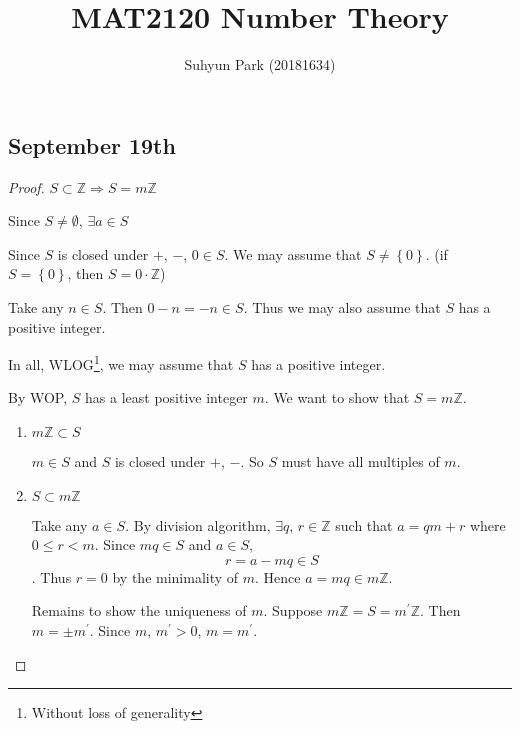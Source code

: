 
\usepackage{pgfplots}
\pgfplotsset{compat=newest}



\title{MAT2120 Number Theory}
\author{Suhyun Park (20181634)}

\subsection{September 19th}

\begin{proof}
    $S \subset \mathbb{Z} \Rightarrow S = m\mathbb{Z}$

    Since $S \neq \emptyset$, $\exists a \in S$

    Since $S$ is closed under $+$, $-$, $0 \in S$. We may assume that
    $S \neq \left\{0\right\}$. (if $S = \left\{0\right\}$, then $S = 0\cdot \mathbb{Z}$)

    Take any $n \in S$. Then $0 - n = -n \in S$.
    Thus we may also assume that $S$ has a positive integer.

    In all, WLOG\footnote{Without loss of generality},
    we may assume that $S$ has a positive integer.

    By WOP, $S$ has a least positive integer $m$. We want to show that $S=m\mathbb{Z}$.


    \begin{enumerate}
        \item $m\mathbb{Z} \subset S$
        
        $m \in S$ and $S$ is closed under $+$, $-$. So $S$ must have all multiples of $m$.

        \item $S \subset m\mathbb{Z}$
        
        Take any $a \in S$. By division algorithm, $\exists q,\, r \in \mathbb{Z}$ such that
        $a = qm + r$ where $0 \leq r < m$.
        Since $mq \in S$ and $a \in S$, \[r = a - mq \in S\].
        Thus $r = 0$ by the minimality of $m$. Hence $a = mq \in m\mathbb{Z}$.

        Remains to show the uniqueness of $m$. Suppose $m\mathbb{Z} = S = m^\prime\mathbb{Z}$.
        Then $m = \pm m^\prime$.
        Since $m,\,m^\prime > 0$, $m=m^\prime$.
    \end{enumerate}
\end{proof}

